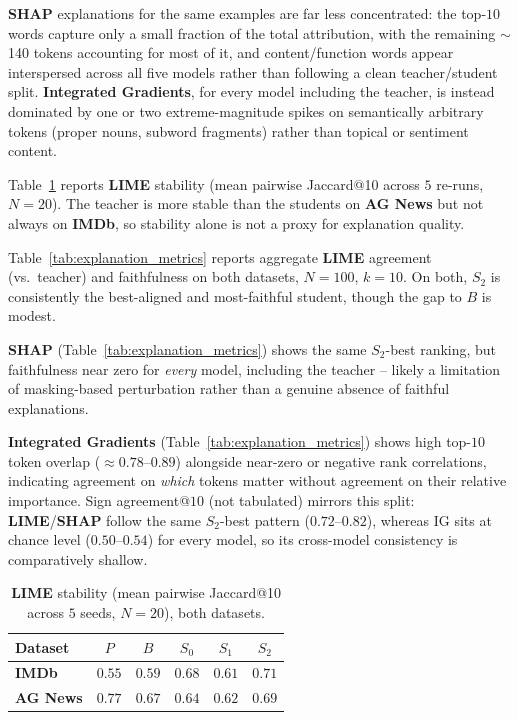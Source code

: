 \documentclass[conference]{IEEEtran}
\begin{document}
\textbf{SHAP} explanations for the same examples are far less concentrated: the top-$10$ words capture only a small fraction of the total attribution, with the remaining $\sim$140 tokens accounting for most of it, and content/function words appear interspersed across all five models rather than following a clean teacher/student split. \textbf{Integrated Gradients}, for every model including the teacher, is instead dominated by one or two extreme-magnitude spikes on semantically arbitrary tokens (proper nouns, subword fragments) rather than topical or sentiment content.

Table~\ref{tab:stability} reports \textbf{LIME} stability (mean pairwise Jaccard@10 across $5$ re-runs, $N=20$). The teacher is more stable than the students on \textbf{AG News} but not always on \textbf{IMDb}, so stability alone is not a proxy for explanation quality.

Table~\ref{tab:explanation_metrics} reports aggregate \textbf{LIME} agreement (vs.\ teacher) and faithfulness on both datasets, $N=100$, $k=10$. On both, $S_2$ is consistently the best-aligned and most-faithful student, though the gap to $B$ is modest.

\textbf{SHAP} (Table~\ref{tab:explanation_metrics}) shows the same $S_2$-best ranking, but faithfulness near zero for \emph{every} model, including the teacher -- likely a limitation of masking-based perturbation rather than a genuine absence of faithful explanations.

\textbf{Integrated Gradients} (Table~\ref{tab:explanation_metrics}) shows high top-$10$ token overlap ($\approx0.78$--$0.89$) alongside near-zero or negative rank correlations, indicating agreement on \emph{which} tokens matter without agreement on their relative importance. Sign agreement@$10$ (not tabulated) mirrors this split: \textbf{LIME}/\textbf{SHAP} follow the same $S_2$-best pattern ($0.72$--$0.82$), whereas IG sits at chance level ($0.50$--$0.54$) for every model, so its cross-model consistency is comparatively shallow.

\begin{table}[bp]
\centering
\caption{\textbf{LIME} stability (mean pairwise Jaccard@10 across $5$ seeds, $N=20$), both datasets.}
\small
\begin{tabular}{|l|c|c|c|c|c|}
\hline
Dataset & $P$ & $B$ & $S_0$ & $S_1$ & $S_2$ \\ \hline
\textbf{IMDb} & $0.55$ & $0.59$ & $0.68$ & $0.61$ & $0.71$ \\
\textbf{AG News} & $0.77$ & $0.67$ & $0.64$ & $0.62$ & $0.69$ \\ \hline
\end{tabular}
\label{tab:stability}
\end{table}
\end{document}
